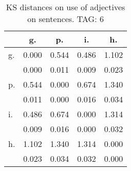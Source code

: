 \begin{table}[h!]
\begin{center}
\begin{tabular}{| l | c | c | c | c |}\hline
 & g. & p. & i. & h. \\\hline
g. & 0.000  & 0.544  & 0.486  & 1.102 \\\hline
 & 0.000  & 0.011  & 0.009  & 0.023 \\\hline
p. & 0.544  & 0.000  & 0.674  & 1.340 \\\hline
 & 0.011  & 0.000  & 0.016  & 0.034 \\\hline
i. & 0.486  & 0.674  & 0.000  & 1.314 \\\hline
 & 0.009  & 0.016  & 0.000  & 0.032 \\\hline
h. & 1.102  & 1.340  & 1.314  & 0.000 \\\hline
 & 0.023  & 0.034  & 0.032  & 0.000 \\\hline
\end{tabular}
\caption{KS distances on use of adjectives on sentences. TAG: 6}
\end{center}
\end{table}
